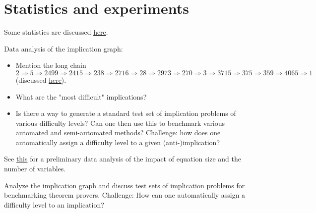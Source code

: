 \section{Statistics and experiments}


Some statistics are discussed \href{https://leanprover.zulipchat.com/#narrow/channel/458659-Equational/topic/A.20final.20end-to-end.20theorem.20in.20Lean}{here}.

Data analysis of the implication graph:

\begin{itemize}
    \item Mention the long chain $2 \Rightarrow 5 \Rightarrow 2499 \Rightarrow 2415 \Rightarrow 238 \Rightarrow 2716 \Rightarrow 28 \Rightarrow 2973 \Rightarrow 270 \Rightarrow 3 \Rightarrow 3715 \Rightarrow 375 \Rightarrow 359 \Rightarrow 4065 \Rightarrow 1$ (discussed \href{https://leanprover.zulipchat.com/#narrow/stream/458659-Equational/topic/visualization.20of.20graph.20closure}{here}).
    \item What are the "most difficult" implications?
    \item Is there a way to generate a standard test set of implication problems of various difficulty levels? Can one then use this to benchmark various automated and semi-automated methods? Challenge: how does one automatically assign a difficulty level to a given (anti-)implication?
\end{itemize}


See \href{https://leanprover.zulipchat.com/#narrow/channel/458659-Equational/topic/Outlier.20hunting}{this} for a preliminary data analysis of the impact of equation size and the number of variables.

Analyze the implication graph and discuss test sets of implication problems for benchmarking theorem provers. Challenge: How can one automatically assign a difficulty level to an implication?
